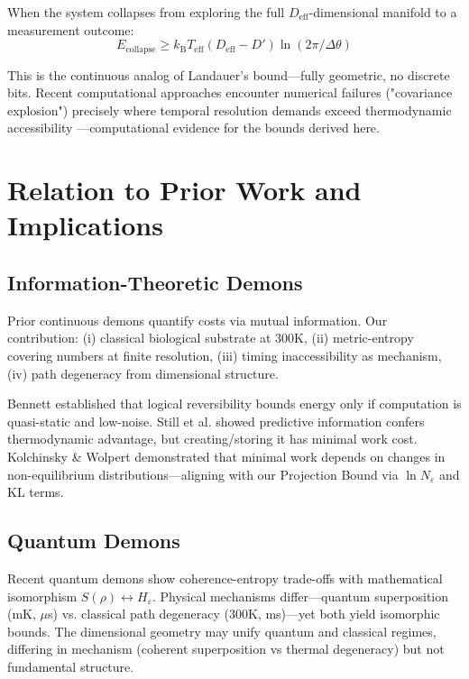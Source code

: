 \documentclass[12pt]{article}
\numberwithin{equation}{section}
\newcommand{\kB}{k_{\mathrm{B}}}
\newcommand{\Teff}{T_{\mathrm{eff}}}
\begin{document}
When the system collapses from exploring the full $D_{\text{eff}}$-dimensional manifold to a measurement outcome:
\begin{equation}
E_{\text{collapse}} \geq \kB \Teff (D_{\text{eff}} - D') \ln(2\pi/\Delta\theta)
\end{equation}

This is the continuous analog of Landauer's bound—fully geometric, no discrete bits. Recent computational approaches encounter numerical failures ("covariance explosion") precisely where temporal resolution demands exceed thermodynamic accessibility \cite{bian2025ddga}—computational evidence for the bounds derived here.

\section{Relation to Prior Work and Implications}

\subsection{Information-Theoretic Demons}

Prior continuous demons \cite{parrondo1996,vaikuntanathan2009,allahverdyan2009} quantify costs via mutual information. Our contribution: (i) classical biological substrate at 300K, (ii) metric-entropy covering numbers at finite resolution, (iii) timing inaccessibility as mechanism, (iv) path degeneracy from dimensional structure.

Bennett \cite{bennett1982} established that logical reversibility bounds energy only if computation is quasi-static and low-noise. Still et al. \cite{still2012} showed predictive information confers thermodynamic advantage, but creating/storing it has minimal work cost. Kolchinsky \& Wolpert \cite{kolchinsky2018} demonstrated that minimal work depends on changes in non-equilibrium distributions—aligning with our Projection Bound via $\ln N_\varepsilon$ and KL terms.

\subsection{Quantum Demons}

Recent quantum demons \cite{PhysRevResearch2024,PhysRevA2016} show coherence-entropy trade-offs with mathematical isomorphism $S(\rho) \leftrightarrow H_\varepsilon$. Physical mechanisms differ—quantum superposition (mK, $\mu$s) vs. classical path degeneracy (300K, ms)—yet both yield isomorphic bounds. The dimensional geometry may unify quantum and classical regimes, differing in mechanism (coherent superposition vs thermal degeneracy) but not fundamental structure.
\end{document}
